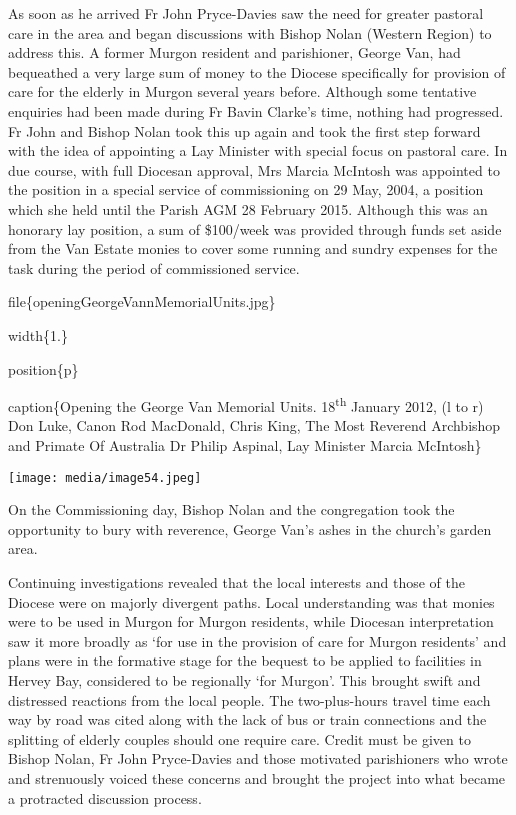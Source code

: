 As soon as he arrived Fr John Pryce-Davies saw the need for greater pastoral care in the area and began discussions with Bishop Nolan (Western Region) to address this. A former Murgon resident and parishioner, George Van, had bequeathed a very large sum of money to the Diocese specifically for provision of care for the elderly in Murgon several years before. Although some tentative enquiries had been made during Fr Bavin Clarke's time, nothing had progressed. Fr John and Bishop Nolan took this up again and took the first step forward with the idea of appointing a Lay Minister with special focus on pastoral care. In due course, with full Diocesan approval, Mrs Marcia McIntosh was appointed to the position in a special service of commissioning on 29 May, 2004, a position which she held until the Parish AGM 28 February 2015. Although this was an honorary lay position, a sum of \$100/week was provided through funds set aside from the Van Estate monies to cover some running and sundry expenses for the task during the period of commissioned service.

file\{openingGeorgeVannMemorialUnits.jpg\}

width\{1.\}

position\{p\}

caption\{Opening the George Van Memorial Units. 18\textsuperscript{th} January 2012, (l to r) Don Luke, Canon Rod MacDonald, Chris King, The Most Reverend Archbishop and Primate Of Australia Dr Philip Aspinal, Lay Minister Marcia McIntosh\}

\texttt{[image: media/image54.jpeg]}

On the Commissioning day, Bishop Nolan and the congregation took the opportunity to bury with reverence, George Van's ashes in the church's garden area.

Continuing investigations revealed that the local interests and those of the Diocese were on majorly divergent paths. Local understanding was that monies were to be used in Murgon for Murgon residents, while Diocesan interpretation saw it more broadly as `for use in the provision of care for Murgon residents' and plans were in the formative stage for the bequest to be applied to facilities in Hervey Bay, considered to be regionally `for Murgon'. This brought swift and distressed reactions from the local people. The two-plus-hours travel time each way by road was cited along with the lack of bus or train connections and the splitting of elderly couples should one require care. Credit must be given to Bishop Nolan, Fr John Pryce-Davies and those motivated parishioners who wrote and strenuously voiced these concerns and brought the project into what became a protracted discussion process.

